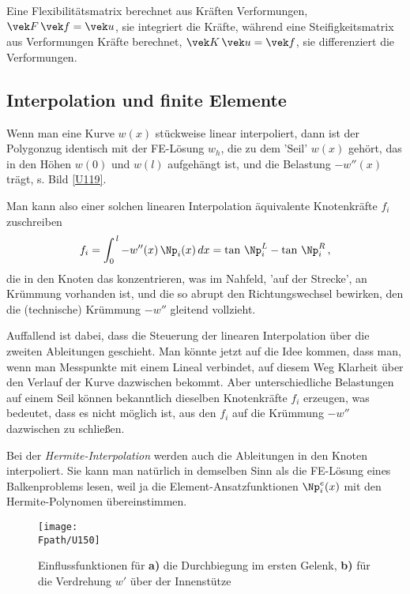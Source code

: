 {{{{{{{{Eine Flexibilit\"{a}tsmatrix berechnet aus Kr\"{a}ften Verformungen, $\vek F\,\vek f = \vek u$, sie integriert die Kr\"{a}fte, w\"{a}hrend eine Steifigkeitsmatrix aus Verformungen Kr\"{a}fte berechnet, $\vek K\,\vek u = \vek f$, sie differenziert die Verformungen.

{\textcolor{blau2}{\subsection{Interpolation und finite Elemente}}
Wenn man eine Kurve $w(x)$ st\"{u}ckweise linear interpoliert, dann ist
der Polygonzug  identisch mit der FE-L\"{o}sung $w_h$, die zu dem 'Seil' $w(x)$ geh\"{o}rt, das in den H\"{o}hen $w(0)$ und $w(l)$ aufgeh\"{a}ngt ist, und die Belastung $- w''(x)$ tr\"{a}gt, s. Bild \ref{U119}.

Man kann also einer solchen linearen Interpolation \"{a}quivalente Knotenkr\"{a}fte $f_i$ zuschreiben
\begin{align}
f_i = \int_0^{\,l} - w''(x)\,\Np_i(x)\,dx= \tan\,\Np_i^L - \tan\,\Np_i^R \,,
\end{align}
die in den Knoten das konzentrieren, was im Nahfeld, 'auf der Strecke', an Kr\"{u}mmung vorhanden ist, und die so abrupt den Richtungswechsel
 bewirken, den die (technische) Kr\"{u}mmung $-w''$ gleitend vollzieht.

Auffallend ist dabei, dass die Steuerung der linearen Interpolation \"{u}ber die zweiten Ableitungen geschieht. Man k\"{o}nnte jetzt auf die Idee kommen, dass man, wenn man Messpunkte mit einem Lineal verbindet, auf diesem Weg Klarheit \"{u}ber den Verlauf der Kurve dazwischen bekommt. Aber  unterschiedliche Belastungen auf einem Seil k\"{o}nnen bekanntlich dieselben Knotenkr\"{a}fte $f_i$ erzeugen, was bedeutet, dass es nicht m\"{o}glich ist, aus den $f_i$ auf die Kr\"{u}mmung $-w''$ dazwischen zu schlie{\ss}en.

Bei der {\em Hermite-Interpolation\/} werden auch die Ableitungen in den Knoten interpoliert. Sie kann man nat\"{u}rlich in demselben Sinn als die FE-L\"{o}sung eines Balkenproblems lesen, weil ja die Element-Ansatzfunktionen $\Np_i^e(x)$ mit den Hermite-Polynomen \"{u}bereinstimmen.



\begin{figure}[tbp]
\centering
\if {} \sidecaption \fi
\texttt{[image: \\Fpath/U150]}
\caption{Einflussfunktionen f\"{u}r \textbf{ a)} die Durchbiegung im ersten Gelenk, \textbf{ b)} f\"{u}r die Verdrehung $w'$ \"{u}ber der Innenst\"{u}tze} \label{U150}
\end{figure}%

}}}}}}}}}
